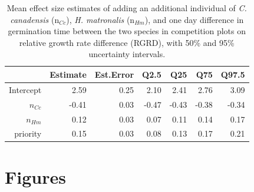 \documentclass{article}
\begin{document}
\pagebreak[4]

\begin{table}[hp]
\centering
\begin{tabular}{rrrrrrr}
  \hline
 & Estimate & Est.Error & Q2.5 & Q25 & Q75 & Q97.5 \\ 
  \hline
Intercept & 2.59 & 0.25 & 2.10 & 2.41 & 2.76 & 3.09 \\ 
  $n_{Cc}$ & -0.41 & 0.03 & -0.47 & -0.43 & -0.38 & -0.34 \\ 
  $n_{Hm}$ & 0.12 & 0.03 & 0.07 & 0.11 & 0.14 & 0.17 \\ 
  priority & 0.15 & 0.03 & 0.08 & 0.13 & 0.17 & 0.21 \\ 
   \hline
\end{tabular}
\caption{Mean effect size estimates of adding an additional individual of \textit{C. canadensis} (n$_{Cc}$), \textit{H. matronalis} (n$_{Hm}$), and one day difference in germination time between the two species in competition plots on relative growth rate difference (RGRD), with 50\% and 95\% uncertainty intervals.}
\label{tab:RGRD}
\end{table}

\pagebreak[4]

\section*{Figures}
\end{document}
